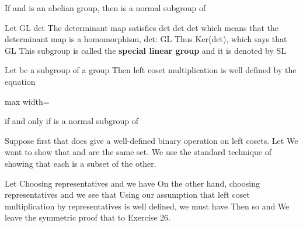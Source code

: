 \documentclass[11pt,oneside]{article}
\begin{document}
\BookNarrativetrue

\begin{BookBody}

 If  and  is an abelian group, then  is a normal subgroup of  \BookEnd{\blacktriangle}

 Let  GL det The determinant map satisfies det det det which means that the determinant map is a homomorphism, det: GL Thus Ker(det), which says that  GL This subgroup  is called the\textbf{ special linear group} and it is denoted by SL\BookEnd{\blacktriangle}

 Let  be a subgroup of a group  Then left coset multiplication is well defined by the equation

\begin{center}\begin{adjustbox}{max width=\linewidth}\end{adjustbox}\end{center}

\noindent if and only if  is a normal subgroup of 

 Suppose first that  does give a well-defined binary operation on left cosets. Let  We want to show that  and  are the same set. We use the standard technique of showing that each is a subset of the other.

Let  Choosing representatives  and  we have  On the other hand, choosing representatives  and  we see that  Using our assumption that left coset multiplication by representatives is well defined, we must have  Then  so  and  We leave the symmetric proof that  to Exercise 26.


\end{BookBody}
\end{document}
